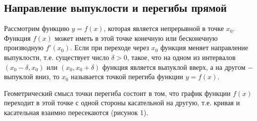 \documentclass[oneside]{book}
\begin{document}
\begin{enumerate}
\begin{itemize}
\begin{enumerate}
\setcounter{chapter}{28}
\chapter{Направление выпуклости и перегибы прямой}

Рассмотрим функцию $y = f\left( x \right)$, которая является непрерывной в точке ${x_0}$. Функция $f\left( x \right)$ может иметь в этой точке конечную или бесконечную производную $f'\left( {{x_0}} \right)$. Если при переходе через ${x_0}$ функция меняет направление выпуклости, т.е. существует число $\delta > 0$, такое, что на одном из интервалов $\left( {{x_0} - \delta ,{x_0}} \right)$ или $\left( {{x_0},{x_0} + \delta } \right)$ функция является выпуклой вверх, а на другом − выпуклой вниз, то ${x_0}$ называется точкой перегиба функции $y = f\left( x \right)$.

Геометрический смысл точки перегиба состоит в том, что график функции $f\left( x \right)$ переходит в этой точке с одной стороны касательной на другую, т.е. кривая и касательная взаимно пересекаются (рисунок 1).


\end{enumerate}
\end{itemize}
\end{enumerate}
\end{document}
